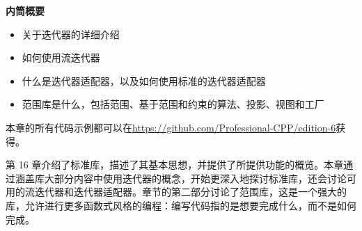 \noindent
\textbf{内筒概要}

\begin{itemize}
\item
关于迭代器的详细介绍

\item
如何使用流迭代器

\item
什么是迭代器适配器，以及如何使用标准的迭代器适配器

\item
范围库是什么，包括范围、基于范围和约束的算法、投影、视图和工厂
\end{itemize}

本章的所有代码示例都可以在\url{https://github.com/Professional-CPP/edition-6}获得。

第 16 章介绍了标准库，描述了其基本思想，并提供了所提供功能的概览。本章通过涵盖库大部分内容中使用迭代器的概念，开始更深入地探讨标准库，还会讨论可用的流迭代器和迭代器适配器。章节的第二部分讨论了范围库，这是一个强大的库，允许进行更多函数式风格的编程：编写代码指的是想要完成什么，而不是如何完成。
